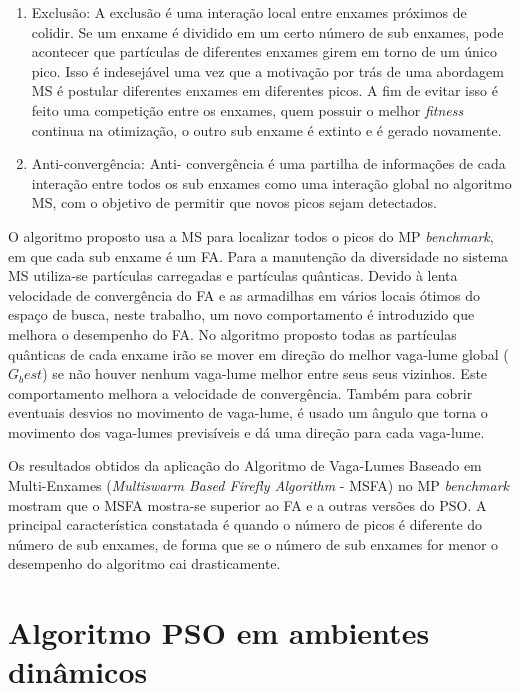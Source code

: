 \begin{enumerate}
\item Exclusão: A exclusão é uma interação local entre enxames próximos de colidir. Se um enxame é dividido em um certo número de sub enxames, pode acontecer que partículas de diferentes enxames girem em torno de um único pico. Isso é indesejável uma vez que a motivação por trás de uma abordagem MS é postular diferentes enxames em diferentes picos. A fim de evitar isso é feito uma competição entre os enxames, quem possuir o melhor \textit{fitness} continua na otimização, o outro sub enxame é extinto e é gerado novamente.

\item Anti-convergência: Anti- convergência é uma partilha de informações de cada interação entre todos os sub enxames como uma interação global no algoritmo MS, com o objetivo de permitir que novos picos sejam detectados.
\end{enumerate}

O algoritmo proposto usa a MS para localizar todos o picos do MP \textit{benchmark}, em que cada sub enxame é um FA. Para a manutenção da diversidade no sistema MS utiliza-se partículas carregadas e partículas quânticas. Devido à lenta velocidade de convergência do FA e as armadilhas em vários locais ótimos do espaço de busca, neste trabalho, um novo comportamento é introduzido que melhora o desempenho do FA. No algoritmo proposto todas as partículas quânticas de cada enxame irão se mover em direção do melhor vaga-lume global ($G_best$) se não houver nenhum vaga-lume melhor entre seus seus vizinhos. Este comportamento melhora a velocidade de convergência. Também para cobrir eventuais desvios no movimento de vaga-lume, é usado um ângulo que torna o movimento dos vaga-lumes previsíveis e dá uma direção para cada vaga-lume.

Os resultados obtidos da aplicação do Algoritmo de Vaga-Lumes Baseado em Multi-Enxames (\textit{Multiswarm Based Firefly Algorithm} - MSFA) no MP \textit{benchmark} mostram que o MSFA mostra-se superior ao FA e a outras versões do PSO. A principal característica constatada é quando o número de picos é diferente do número de sub enxames, de forma que se o número de sub enxames for menor o desempenho do algoritmo cai drasticamente.

\section{Algoritmo PSO em ambientes dinâmicos}
\label{sec:pso_behaviour}

